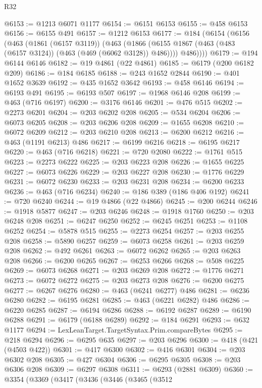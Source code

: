 \begin{lexlean}{R32}
\begin{coremodule}
@6153 := @1213 @6071 @1177
@6154 := @6151 @6153
@6155 := @458 @6153
@6156 := @6155 @491
@6157 := @1212 @6153
@6177 := @184
    (@6154
      (@6156
        (@463
          (@1861 (@6157 @3119))
          (@463
            (@1866 (@6155 @1867 (@463 (@483 (@6157 @3124)) (@463 (@469 (@6062 @3128)) @486))))
            @486))))
@6179 := @194 @6144 @6146
@6182 := @19 @4861 (@22 @4861)
@6185 := @6179 (@200 @6182 @209)
@6186 := @184 @6185
@6188 := @243 @1652 @2844
@6190 := @401 @1652 @3639
@6192 := @435 @1652 @3642
@6193 := @458 @6146
@6194 := @6193 @491
@6195 := @6193 @507
@6197 := @1968 @6146 @208
@6199 := @463 (@716 @6197)
@6200 := @3176 @6146
@6201 := @476 @515
@6202 := @2273 @6201
@6204 := @203 @6202 @208
@6205 := @534 @6204
@6206 := @6073 @6205
@6208 := @203 @6206 @208
@6209 := @1655 @6208
@6210 := @6072 @6209
@6212 := @203 @6210 @208
@6213 := @6200 @6212
@6216 := @463 (@1191 @6213) @486
@6217 := @6199 @6216
@6218 := @6195 @6217
@6220 := @463 (@716 @6218)
@6221 := @720 @2080
@6222 := @1761 @515
@6223 := @2273 @6222
@6225 := @203 @6223 @208
@6226 := @1655 @6225
@6227 := @6073 @6226
@6229 := @203 @6227 @208
@6230 := @1776 @6229
@6231 := @6072 @6230
@6233 := @203 @6231 @208
@6234 := @6200 @6233
@6236 := @463 (@716 @6234)
@6240 := @186 @389 (@186 @406 @192)
@6241 := @720 @6240
@6244 := @19 @4866 (@22 @4866)
@6245 := @200 @6244
@6246 := @1918 @5877
@6247 := @203 @6246
@6248 := @1918 @1760
@6250 := @203 @6248 @208
@6251 := @6247 @6250
@6252 := @6245 @6251
@6253 := @1108 @6252
@6254 := @5878 @515
@6255 := @2273 @6254
@6257 := @203 @6255 @208
@6258 := @5890 @6257
@6259 := @6073 @6258
@6261 := @203 @6259 @208
@6262 := @492 @6261
@6263 := @6072 @6262
@6265 := @203 @6263 @208
@6266 := @6200 @6265
@6267 := @6253 @6266
@6268 := @508 @6225
@6269 := @6073 @6268
@6271 := @203 @6269 @208
@6272 := @1776 @6271
@6273 := @6072 @6272
@6275 := @203 @6273 @208
@6276 := @6200 @6275
@6277 := @6267 @6276
@6280 := @463 (@6241 @6277) @486
@6281 := @6236 @6280
@6282 := @6195 @6281
@6285 := @463 (@6221 @6282) @486
@6286 := @6220 @6285
@6287 := @6194 @6286
@6288 := @6192 @6287
@6289 := @6190 @6288
@6291 := @6179 (@6188 @6289)
@6292 := @184 @6291
@6293 := @632 @1177
@6294 := LexLeanTarget.TargetSyntax.Prim.compareBytes
@6295 := @218 @6294
@6296 := @6295 @635
@6297 := @203 @6296
@6300 := @418 (@421 (@4503 @422))
@6301 := @417 @6300
@6302 := @416 @6301
@6304 := @203 @6302 @208
@6305 := @427 @6304
@6306 := @6295 @6305
@6308 := @203 @6306 @208
@6309 := @6297 @6308
@6311 := @6293 (@2881 @6309)
@6360 := @3354
    (@3369
      (@3417
        (@3436
          (@3446
            (@3465
              (@3512

\end{coremodule}
\end{lexlean}
